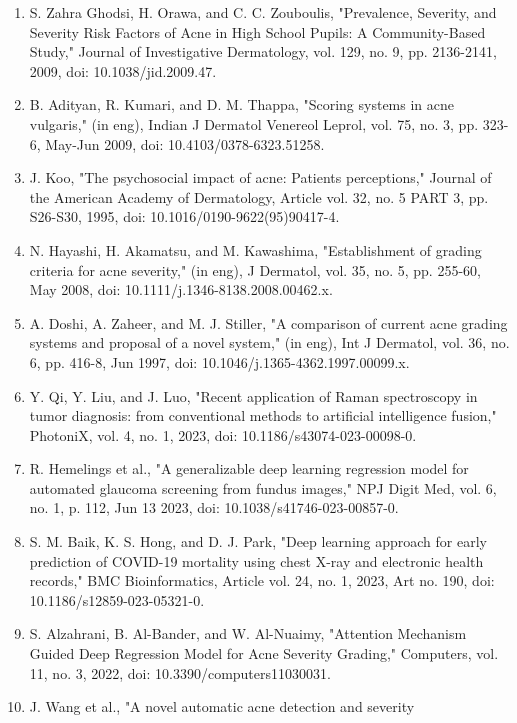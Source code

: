 \documentclass[16pt]{extarticle}
\begin{document}
\begin{enumerate}
\def\labelenumi{\arabic{enumi}.}
\item
  S. Zahra Ghodsi, H. Orawa, and C. C. Zouboulis, "Prevalence, Severity,
  and Severity Risk Factors of Acne in High School Pupils: A
  Community-Based Study," Journal of Investigative Dermatology, vol.
  129, no. 9, pp. 2136-2141, 2009, doi: 10.1038/jid.2009.47.
\item
  B. Adityan, R. Kumari, and D. M. Thappa, "Scoring systems in acne
  vulgaris," (in eng), Indian J Dermatol Venereol Leprol, vol. 75, no.
  3, pp. 323-6, May-Jun 2009, doi: 10.4103/0378-6323.51258.
\item
  J. Koo, "The psychosocial impact of acne: Patients\textquotesingle{}
  perceptions," Journal of the American Academy of Dermatology, Article
  vol. 32, no. 5 PART 3, pp. S26-S30, 1995, doi:
  10.1016/0190-9622(95)90417-4.
\item
  N. Hayashi, H. Akamatsu, and M. Kawashima, "Establishment of grading
  criteria for acne severity," (in eng), J Dermatol, vol. 35, no. 5, pp.
  255-60, May 2008, doi: 10.1111/j.1346-8138.2008.00462.x.
\item
  A. Doshi, A. Zaheer, and M. J. Stiller, "A comparison of current acne
  grading systems and proposal of a novel system," (in eng), Int J
  Dermatol, vol. 36, no. 6, pp. 416-8, Jun 1997, doi:
  10.1046/j.1365-4362.1997.00099.x.
\item
  Y. Qi, Y. Liu, and J. Luo, "Recent application of Raman spectroscopy
  in tumor diagnosis: from conventional methods to artificial
  intelligence fusion," PhotoniX, vol. 4, no. 1, 2023, doi:
  10.1186/s43074-023-00098-0.
\item
  R. Hemelings et al., "A generalizable deep learning regression model
  for automated glaucoma screening from fundus images," NPJ Digit Med,
  vol. 6, no. 1, p. 112, Jun 13 2023, doi: 10.1038/s41746-023-00857-0.
\item
  S. M. Baik, K. S. Hong, and D. J. Park, "Deep learning approach for
  early prediction of COVID-19 mortality using chest X-ray and
  electronic health records," BMC Bioinformatics, Article vol. 24, no.
  1, 2023, Art no. 190, doi: 10.1186/s12859-023-05321-0.
\item
  S. Alzahrani, B. Al-Bander, and W. Al-Nuaimy, "Attention Mechanism
  Guided Deep Regression Model for Acne Severity Grading," Computers,
  vol. 11, no. 3, 2022, doi: 10.3390/computers11030031.
\item
  J. Wang et al., "A novel automatic acne detection and severity

\end{enumerate}
\end{document}
